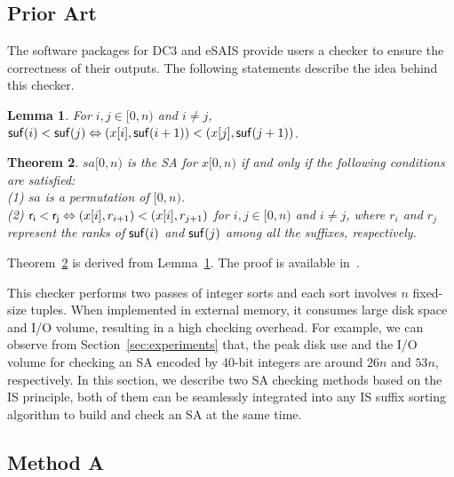 \documentclass[10pt,journal,compsoc]{IEEEtran}
\newtheorem{theorem}{Theorem}[section]
\newtheorem{lemma}[theorem]{Lemma}
\begin{document}
\subsection{Prior Art} \label{sec:checkers:prior_art}

The software packages for DC3 and eSAIS provide users a checker to ensure the correctness of their outputs. The following statements describe the idea behind this checker. 

\begin{lemma} \label{lemma:1}
	For $i, j \in [0, n)$ and $i \ne j$, ${\sf suf}(i) < {\sf suf}(j) \Leftrightarrow (x[i], {\sf suf}(i + 1)) < (x[j], {\sf suf}(j + 1))$.
\end{lemma}

\begin{theorem} \label{theorem:1}
	$sa[0, n)$ is the SA for $x[0, n)$ if and only if the following conditions are satisfied:\\
	(1) $sa$ is a permutation of $[0, n)$. \\	
	(2) ${\sf r_i < r_j} \Leftrightarrow (x[i], r_{i + 1}) < (x[i], r_{j + 1})$ for $ i, j \in [0, n)$ and $i\ne j$, where $r_i$ and $r_j$ represent the ranks of ${\sf suf}(i)$ and ${\sf suf}(j)$ among all the suffixes, respectively. \\
\end{theorem}

\begin{IEEEproof}
	Theorem~\ref{theorem:1} is derived from Lemma~\ref{lemma:1}. The proof is available in~\cite{Dementiev2008a}.
\end{IEEEproof}

This checker performs two passes of integer sorts and each sort involves $n$ fixed-size tuples. When implemented in external memory, it consumes large disk space and I/O volume, resulting in a high checking overhead. For example, we can observe from Section~\ref{sec:experiments} that, the peak disk use and the I/O volume for checking an SA encoded by 40-bit integers are around $26n$ and $53n$, respectively. In this section,  we describe two SA checking methods based on the IS principle, both of them can be seamlessly integrated into any IS suffix sorting algorithm to build and check an SA at the same time.

\subsection{Method A} \label{sec:checkers:method_a}
\end{document}
